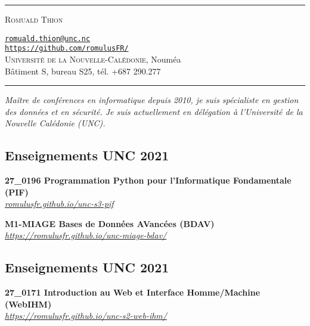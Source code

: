 \documentclass[12pt,a4paper]{article}
\newcommand{\hr}{\textcolor{gris80}{\rule{\linewidth}{0.5pt}}}
\newcommand{\activite}[1]{\textbf{#1}\xspace}
\newcommand{\comment}[1]{\textsl{#1}\xspace}
\newcommand{\UNC}{\textsc{Universit{\'e} de la Nouvelle-Calédonie}\xspace}
\begin{document}
\hr

\vspace{0.5em}

\begin{minipage}[c]{0.5\textwidth}
  \begin{center}
    {\LARGE\textsc{Romuald Thion}} %
  \end{center}
\end{minipage}
\begin{minipage}[c]{0.5\textwidth}
  \begin{center}
    \href{mailto:romuald.thion@unc.nc}{\nolinkurl{romuald.thion@unc.nc}}\\
    \href{https://github.com/romulusFR/}{\nolinkurl{https://github.com/romulusFR/}}\\
    \UNC, Nouméa\\
    Bâtiment S, bureau S25, tél. +687 290.277
  \end{center}
\end{minipage}

\vspace{0.5em}

\hr

\begin{center}
  \emph{Maître de conférences en informatique depuis 2010, je suis spécialiste en gestion des données et en sécurité. Je suis actuellement en délégation à l'Université de la Nouvelle Calédonie (UNC).}
\end{center}

\subsection*{Enseignements UNC 2021} 
     \activite{27\_0196 Programmation Python pour l'Informatique Fondamentale (PIF)}\\
     \comment{\url{romulusfr.github.io/unc-s3-pif}} 

     \activite{M1-MIAGE Bases de Données AVancées (BDAV)}\\
     \comment{\url{https://romulusfr.github.io/unc-miage-bdav/}} 


\subsection*{Enseignements UNC 2021} 
     \activite{27\_0171 Introduction au Web et Interface Homme/Machine (WebIHM)}\\
     \comment{\url{https://romulusfr.github.io/unc-s2-web-ihm/}} 
\end{document}
